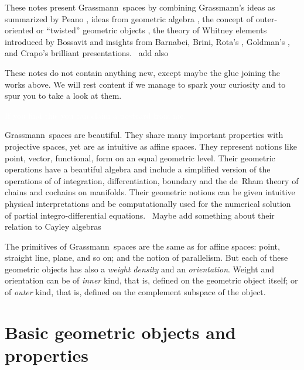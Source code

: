 \documentclass[\ifafour a4paper,12pt,\else a5paper,10pt,\fi%
onecolumn,oneside,article,%
british%
]{memoir}
\theoremstyle{remark}
\theoremstyle{innote}
\newcommand*{\citey}{\parencites*}
\renewcommand*{\|}{\nonscript\,\vert\nonscript\;\mathopen{}}
\newcommand*{\puzzle}{{\fontencoding{U}\fontfamily{fontawesometwo}\selectfont\symbol{225}}}
\newcommand{\mynote}[1]{ {\color{notecolour}\puzzle\ #1}}
\newcommand*{\gm}{Grassmann}
\begin{document}
These notes present \gm\ spaces by combining \gm's ideas as summarized by
Peano \citey{peano1888}, ideas from geometric algebra
\cite{dorstetal2007,li2008}, the concept of outer-oriented or
\enquote{twisted} geometric objects
\cite{veblenetal1932,schoutenetal1940,schouten1951_r1989,burke1983,burke1985_r1987,burke1995,bossavit1994_r2002,bossavit2003b},
the theory of Whitney elements introduced by Bossavit
\cite{bossavit2002_r2005,bossavit2003b,whitney1957,gawliketal2010,brinietal2011,arnoldetal2009_r2010}
and insights from Barnabei, Brini, Rota's
\citey{brinietal2011,barnabeietal1985}, Goldman's
\citey{goldman2002,goldman2000}, and Crapo's \citey{crapo2009} brilliant
presentations. \mynote{add also
  \cite{bambergetal1988_r1990,bambergetal1990_r1992,frankel1997_r2012}}

These notes do not contain anything new, except maybe the glue joining the
works above. We will rest content if we manage to spark your curiosity and
to spur you to take a look at them.

\textcolor{white}{If you find this you can claim a postcard from me.}

\gm\ spaces are beautiful. They share many important properties with
projective spaces, yet are as intuitive as affine spaces. They represent
notions like point, vector, functional, form on an equal geometric level.
Their geometric operations have a beautiful algebra and include a
simplified version of the operations of of integration, differentiation,
boundary and the de~Rham theory of chains and cochains on manifolds. Their
geometric notions can be given intuitive physical interpretations and be
computationally used for the numerical solution of partial
integro-differential equations. \mynote{Maybe add something about their
  relation to Cayley algebras}

The primitives of \gm\ spaces are the same as for affine spaces: point,
straight line, plane, and so on; and the notion of parallelism. But each of
these geometric objects has also a \emph{weight density} and an
\emph{orientation}. Weight and orientation can be of \emph{inner} kind,
that is, defined on the geometric object itself; or of \emph{outer} kind,
that is, defined on the complement subspace of the object.


\section{Basic geometric objects and properties}
\label{sec:basic_objects_properties}
\end{document}
